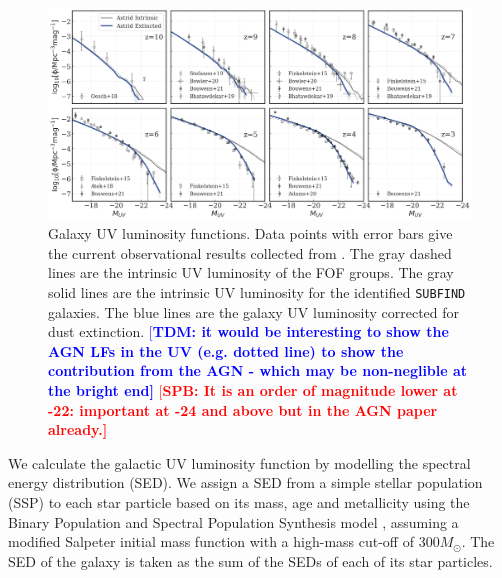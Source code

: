 \documentclass[fleqn,usenatbib]{mnras}
\def\astrid{\texttt{Astrid} }
\newcommand{\spb}[1]{\textcolor{red}{[\bf SPB: #1]}}
\newcommand{\tiziana}[1]{\textcolor{blue}{[\bf TDM: #1]}}
\begin{document}
\begin{figure}
\centering
  \includegraphics[width=1.0\textwidth]{plots/UVLF-subfind-z10-z3.png}
  \caption{Galaxy UV luminosity functions. Data points with error bars give the current observational results collected from \citet{Bouwens2015,Atek2015,Atek2018,Finkelstein2015,Bhatawdekar2019,Stefanon2019,Adams2020,Bowler2020,Bouwens2021}.
  The gray dashed lines are the intrinsic UV luminosity of the FOF groups.
  The gray solid lines are the intrinsic UV luminosity for the identified \texttt{SUBFIND} galaxies. 
  The blue lines are the galaxy UV luminosity corrected for dust extinction. 
 \tiziana{it would be interesting to show the AGN LFs in the UV (e.g. dotted line) to show the contribution from the AGN - which may be non-neglible at the bright end} \spb{It is an order of magnitude lower at -22: important at -24 and above but in the AGN paper already.} }
  \label{fig:UVLF}
\end{figure}

We calculate the galactic UV luminosity function by modelling the spectral energy distribution (SED).
We assign a SED from a simple stellar population (SSP) to each star particle based on its mass, age and metallicity using the Binary Population and Spectral Population Synthesis model \citep[BPASS, version 2.2;][]{Stanway2018}, assuming a modified Salpeter initial mass function with a high-mass cut-off of $300M_\odot$.
The SED of the galaxy is taken as the sum of the SEDs of each of its star particles. 
\end{document}
